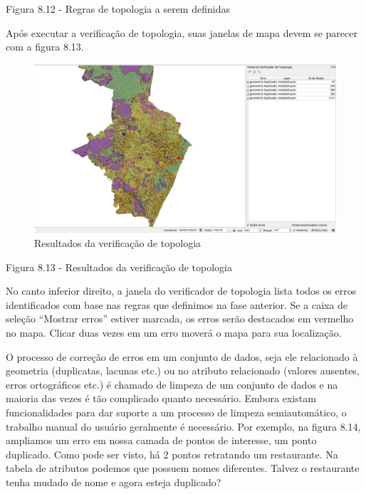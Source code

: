 \documentclass[
]{krantz}
\begin{document}
Figura 8.12 - Regras de topologia a serem definidas

Após executar a verificação de topologia, suas janelas de mapa devem se parecer com a figura 8.13.

\begin{figure}
\centering
\includegraphics{media/modulo8/fig813.png}
\caption{Resultados da verificação de topologia}
\end{figure}

Figura 8.13 - Resultados da verificação de topologia

No canto inferior direito, a janela do verificador de topologia lista todos os erros identificados com base nas regras que definimos na fase anterior. Se a caixa de seleção ``Mostrar erros'' estiver marcada, os erros serão destacados em vermelho no mapa. Clicar duas vezes em um erro moverá o mapa para sua localização.

O processo de correção de erros em um conjunto de dados, seja ele relacionado à geometria (duplicatas, lacunas etc.) ou no atributo relacionado (valores ausentes, erros ortográficos etc.) é chamado de limpeza de um conjunto de dados e na maioria das vezes é tão complicado quanto necessário. Embora existam funcionalidades para dar suporte a um processo de limpeza semiautomático, o trabalho manual do usuário geralmente é necessário. Por exemplo, na figura 8.14, ampliamos um erro em nossa camada de pontos de interesse, um ponto duplicado. Como pode ser visto, há 2 pontos retratando um restaurante. Na tabela de atributos podemos que possuem nomes diferentes. Talvez o restaurante tenha mudado de nome e agora esteja duplicado?
\end{document}
